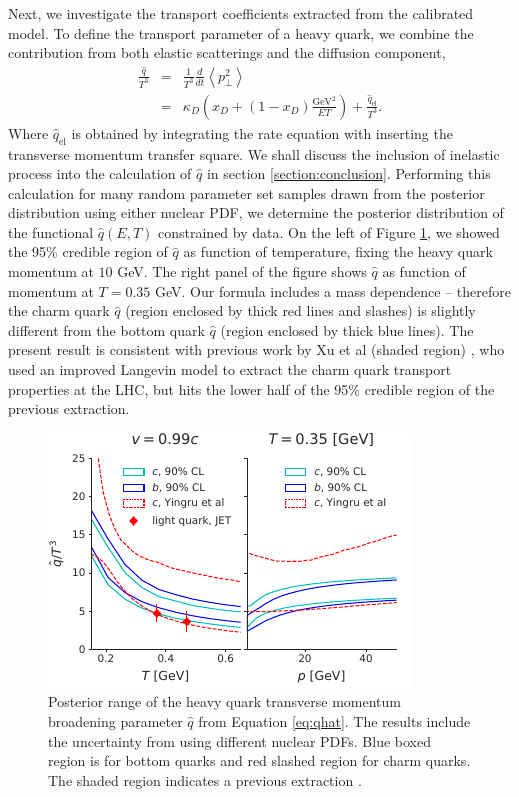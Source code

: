 \documentclass[aps, prc, reprint, amsmath, groupedaddress, nofootinbib]{revtex4-1}
\begin{document}
Next, we investigate the transport coefficients extracted from the calibrated model.
To define the transport parameter of a heavy quark,
we combine the contribution from both elastic scatterings and the diffusion component,
\begin{eqnarray}\label{eq:qhat}
\frac{\hat{q}}{T^3} &=& \frac{1}{T^3}\frac{d}{dt}\left\langle p_\perp^2 \right\rangle\\
\nonumber
 &=&  \kappa_D\left(x_D + (1-x_D)\frac{\textrm{GeV}^2}{ET}\right) + \frac{\hat{q}_{\textrm{el}}}{T^3}.
\end{eqnarray}
Where $\hat{q}_{\textrm{el}}$ is obtained by integrating the rate equation with inserting the transverse momentum transfer square.
We shall discuss the inclusion of inelastic process into the calculation of $\hat{q}$ in section \ref{section:conclusion}.
Performing this calculation for many random parameter set samples drawn from the posterior distribution using either nuclear PDF, we determine the posterior distribution of the functional $\hat{q}(E, T)$ constrained by data.
On the left of Figure \ref{plots:posterior_qhat}, we showed the 95\% credible region of $\hat{q}$ as function of temperature, fixing the heavy quark momentum at $10$ GeV.
The right panel of the figure shows $\hat{q}$ as function of momentum at $T=0.35$ GeV.
Our formula includes a mass dependence -- therefore  the charm quark $\hat{q}$ (region enclosed by thick red lines and slashes) is slightly different from the bottom quark $\hat{q}$ (region enclosed by thick blue lines).
The present result is consistent with previous work by Xu et al (shaded region) \cite{Xu:2017obm}, who used an improved Langevin model to extract the charm quark transport properties at the LHC,  but hits the lower half of the 95\% credible region of the previous extraction.
\begin{figure}
\includegraphics[width=\columnwidth]{qhat_p_T.pdf}
\caption{Posterior range of the heavy quark transverse momentum broadening parameter $\hat{q}$ from Equation \ref{eq:qhat}. The results include the uncertainty from using different nuclear PDFs. Blue boxed region is for bottom quarks and red slashed region for charm quarks. The shaded region indicates a previous extraction \cite{Xu:2017obm}.}\label{plots:posterior_qhat}
\end{figure}
\end{document}
